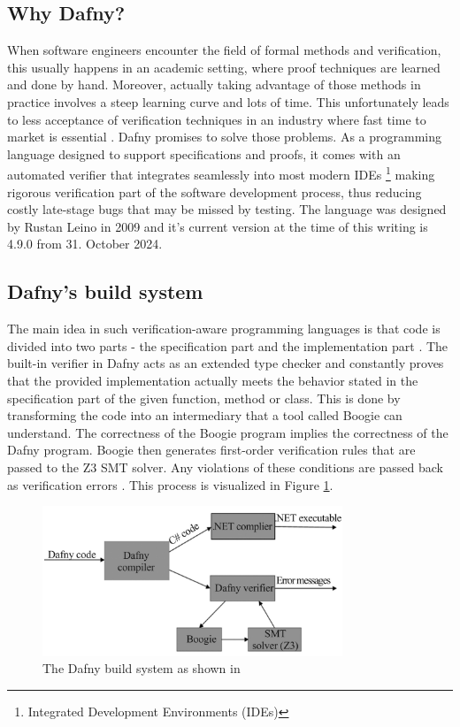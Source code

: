 \documentclass[a4paper]{article}
\begin{document}
\subsection{Why Dafny?}
When software engineers encounter the field of formal methods and verification, this usually happens
in an academic setting, where proof techniques are learned and done by hand. Moreover, actually taking advantage
of those methods in practice involves a steep learning curve and lots of time. This unfortunately leads to less
acceptance of verification techniques in
an industry where fast time to market is essential \cite{reid2020makingformalmethodsnormal}. Dafny promises to solve those problems. As a programming
language designed to support specifications and proofs, it comes with an automated verifier that integrates
seamlessly into most modern IDEs \footnote{Integrated Development Environments (IDEs)} making rigorous verification part of the software development process,
thus reducing costly late-stage bugs that may be missed by testing. The language was designed by Rustan Leino in
2009 and it's current version at the time of this writing is 4.9.0 from 31. October 2024.

\subsection{Dafny's build system}
The main idea in such verification-aware programming languages is that code is divided into two parts - the
specification part and the implementation part \cite{leino2023program}. The built-in verifier in Dafny acts as an
extended type checker and constantly proves that the provided implementation actually meets the behavior stated in
the specification part of the given function, method or class. This is done by transforming the code into an intermediary
that a tool called Boogie can understand. The correctness of the Boogie program implies the correctness of the
Dafny program. Boogie then generates first-order verification rules that are passed to the
Z3 SMT solver. Any violations of these conditions are passed back as verification errors \cite{Herbert2012}. This
process is visualized in Figure \ref{fig:build-system}.
\begin{figure}[h]
	\centering
	\includegraphics[width=0.80\textwidth]{images/dafny-infra.jpg}
	\caption{The Dafny build system as shown in \cite{Herbert2012}}
	\label{fig:build-system}
\end{figure}
\end{document}
